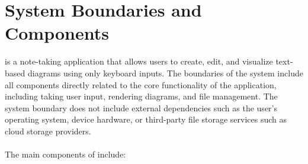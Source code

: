 \documentclass{article}
\begin{document}
\section{System Boundaries and Components}

\progname is a note-taking application that allows users to create, edit, and
visualize text-based diagrams using only keyboard inputs. The boundaries of
the system include all components directly related to the core functionality of
the application, including taking user input, rendering diagrams, and file 
management. The system boundary does not include external dependencies such as 
the user's operating system, device hardware, or third-party file storage services 
such as cloud storage providers.
\\
\\
The main components of \progname include:
\end{document}
